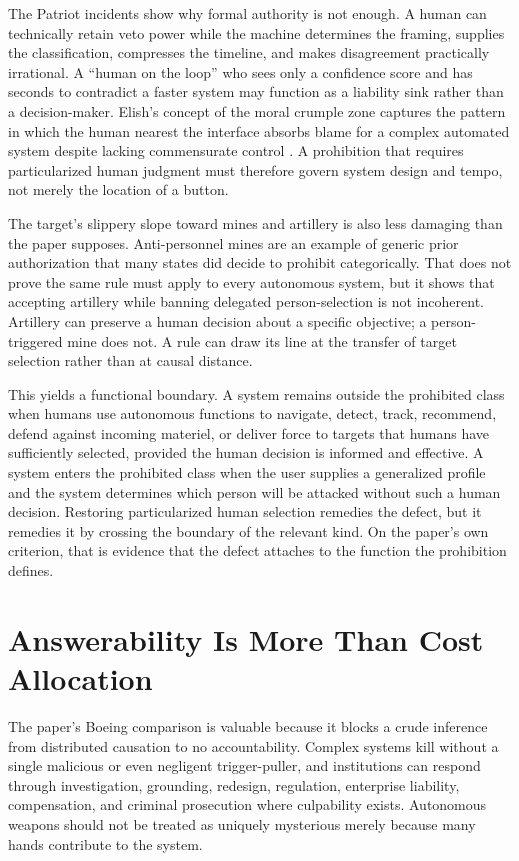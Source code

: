 \documentclass[11pt]{article}
\begin{document}
The Patriot incidents show why formal authority is not enough. A human can technically retain veto power while the machine determines the framing, supplies the classification, compresses the timeline, and makes disagreement practically irrational. A ``human on the loop'' who sees only a confidence score and has seconds to contradict a faster system may function as a liability sink rather than a decision-maker. Elish's concept of the moral crumple zone captures the pattern in which the human nearest the interface absorbs blame for a complex automated system despite lacking commensurate control \citep{elish2019}. A prohibition that requires particularized human judgment must therefore govern system design and tempo, not merely the location of a button.

The target's slippery slope toward mines and artillery is also less damaging than the paper supposes. Anti-personnel mines are an example of generic prior authorization that many states did decide to prohibit categorically. That does not prove the same rule must apply to every autonomous system, but it shows that accepting artillery while banning delegated person-selection is not incoherent. Artillery can preserve a human decision about a specific objective; a person-triggered mine does not. A rule can draw its line at the transfer of target selection rather than at causal distance.

This yields a functional boundary. A system remains outside the prohibited class when humans use autonomous functions to navigate, detect, track, recommend, defend against incoming materiel, or deliver force to targets that humans have sufficiently selected, provided the human decision is informed and effective. A system enters the prohibited class when the user supplies a generalized profile and the system determines which person will be attacked without such a human decision. Restoring particularized human selection remedies the defect, but it remedies it by crossing the boundary of the relevant kind. On the paper's own criterion, that is evidence that the defect attaches to the function the prohibition defines.

\section{Answerability Is More Than Cost Allocation}
\label{sec:answerability}

The paper's Boeing comparison is valuable because it blocks a crude inference from distributed causation to no accountability. Complex systems kill without a single malicious or even negligent trigger-puller, and institutions can respond through investigation, grounding, redesign, regulation, enterprise liability, compensation, and criminal prosecution where culpability exists. Autonomous weapons should not be treated as uniquely mysterious merely because many hands contribute to the system.
\end{document}
